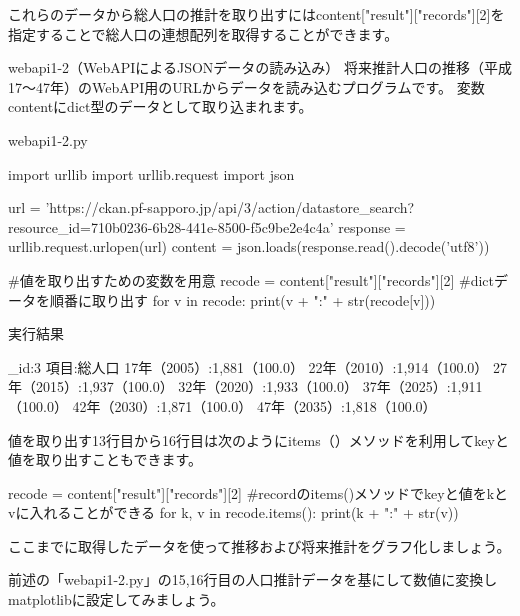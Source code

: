 これらのデータから総人口の推計を取り出すにはcontent["result"]["records"][2]を指定することで総人口の連想配列を取得することができます。
\begin{pabox}{webapi1-2（WebAPIによるJSONデータの読み込み）}
将来推計人口の推移（平成17～47年）のWebAPI用のURLからデータを読み込むプログラムです。
変数contentにdict型のデータとして取り込まれます。
\begin{legbox}{webapi1-2.py}
\begin{listing}{1}
import urllib
import urllib.request
import json

url = 'https://ckan.pf-sapporo.jp/api/3/action/datastore_search?
       resource_id=710b0236-6b28-441e-8500-f5c9be2e4c4a'
response = urllib.request.urlopen(url)
content = json.loads(response.read().decode('utf8'))


#値を取り出すための変数を用意
recode = content["result"]["records"][2]
#dictデータを順番に取り出す
for v in recode:
    print(v + ":" + str(recode[v]))
\end{listing}
実行結果
\begin{listing}{1}
_id:3
項目:総人口
17年（2005）:1,881（100.0）
22年（2010）:1,914（100.0）
27年（2015）:1,937（100.0）
32年（2020）:1,933（100.0）
37年（2025）:1,911（100.0）
42年（2030）:1,871（100.0）
47年（2035）:1,818（100.0）
\end{listing}
値を取り出す13行目から16行目は次のようにitems（）メソッドを利用してkeyと値を取り出すこともできます。
\begin{listing}{1}
recode = content["result"]["records"][2]
#recordのitems()メソッドでkeyと値をkとvに入れることができる
for k, v in recode.items():
    print(k + ":" + str(v))
\end{listing}
\end{legbox}
\end{pabox}

ここまでに取得したデータを使って推移および将来推計をグラフ化しましょう。

前述の「webapi1-2.py」の15,16行目の人口推計データを基にして数値に変換しmatplotlibに設定してみましょう。

